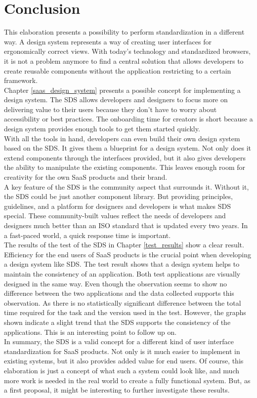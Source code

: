 \newpage
\section{Conclusion}
This elaboration presents a possibility to perform standardization in a different way. A design system represents a way of creating user interfaces for ergonomically correct views. With today's technology and standardized browsers, it is not a problem anymore to find a central solution that allows developers to create reusable components without the application restricting to a certain framework. \\
Chapter \ref{saas_design_system} presents a possible concept for implementing a design system. The \acl{SDS} allows developers and designers to focus more on delivering value to their users because they don't have to worry about accessibility or best practices. The onboarding time for creators is short because a design system provides enough tools to get them started quickly. \\
With all the tools in hand, developers can even build their own design system based on the \ac{SDS}. It gives them a blueprint for a design system. Not only does it extend components through the interfaces provided, but it also gives developers the ability to manipulate the existing components. This leaves enough room for creativity for the own \ac{SaaS} products and their brand.\\
A key feature of the \ac{SDS} is the community aspect that surrounds it. Without it, the \ac{SDS} could be just another component library. But providing principles, guidelines, and a platform for designers and developers is what makes \ac{SDS} special. These community-built values reflect the needs of developers and designers much better than an ISO standard that is updated every two years. In a fast-paced world, a quick response time is important.\\
The results of the test of the \ac{SDS} in Chapter \ref{test_results} show a clear result. Efficiency for the end users of \ac{SaaS} products is the crucial point when developing a design system like \ac{SDS}. The test result shows that a design system helps to maintain the consistency of an application. Both test applications are visually designed in the same way. Even though the observation seems to show no difference between the two applications and the data collected supports this observation. As there is no statistically significant difference between the total time required for the task and the version used in the test. However, the graphs shown indicate a slight trend that the \ac{SDS} supports the consistency of the applications. This is an interesting point to follow up on.\\
In summary, the \ac{SDS} is a valid concept for a different kind of user interface standardization for \ac{SaaS} products. Not only is it much easier to implement in existing systems, but it also provides added value for end users. Of course, this elaboration is just a concept of what such a system could look like, and much more work is needed in the real world to create a fully functional system. But, as a first proposal, it might be interesting to further investigate these results.
